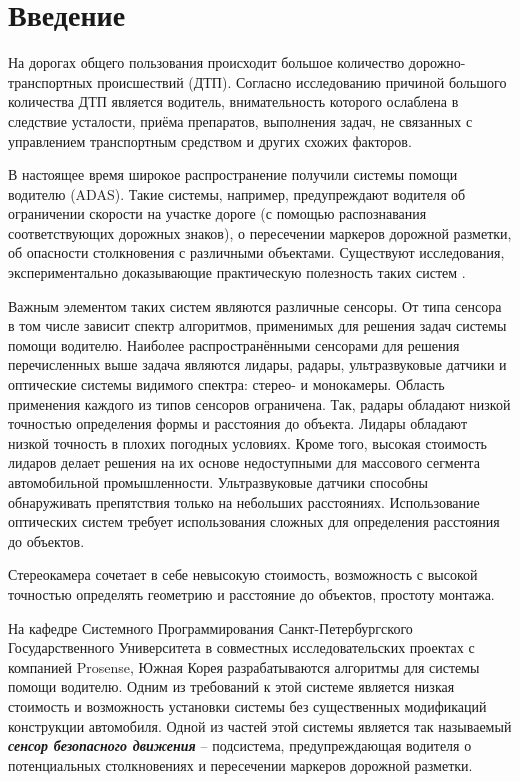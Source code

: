 \documentclass[aps,%
14pt,%
final,%
oneside,
onecolumn,%
musixtex, %
superscriptaddress,%
centertags]{extarticle} %
\begin{document}
\tableofcontents

\setcounter{page}{3}

\newpage

\section*{Введение}

На дорогах общего пользования происходит большое количество дорожно-транспортных происшествий (ДТП). Согласно исследованию \cite{staubach2009factors} причиной большого количества ДТП является водитель, внимательность которого ослаблена в следствие усталости, приёма препаратов, выполнения задач, не связанных с управлением транспортным средством и других схожих факторов.

В настоящее время широкое распространение получили системы помощи водителю (ADAS). Такие системы, например, предупреждают водителя об ограничении скорости на участке дороге (с помощью распознавания соответствующих дорожных знаков), о пересечении маркеров дорожной разметки, об опасности столкновения с различными объектами. Существуют исследования, экспериментально доказывающие практическую полезность таких систем \cite{maag2012studying}.

Важным элементом таких систем являются различные сенсоры. От типа сенсора в том числе зависит спектр алгоритмов, применимых для решения задач системы помощи водителю. Наиболее распространёнными сенсорами для решения перечисленных выше задача являются лидары, радары, ультразвуковые датчики и оптические системы видимого спектра: стерео- и монокамеры. Область применения каждого из типов сенсоров ограничена. Так, радары обладают низкой точностью определения формы и расстояния до объекта. Лидары обладают низкой точность в плохих погодных условиях. Кроме того, высокая стоимость лидаров делает решения на их основе недоступными для массового сегмента автомобильной промышленности. Ультразвуковые датчики способны обнаруживать препятствия только на небольших расстояниях. Использование оптических систем требует использования сложных для определения расстояния до объектов. 

Стереокамера сочетает в себе невысокую стоимость, возможность с высокой точностью определять геометрию и расстояние до объектов, простоту монтажа.

На кафедре Системного Программирования Санкт-Петербургского Государственного Университета в совместных исследовательских проектах с компанией Prosense, Южная Корея разрабатываются алгоритмы для системы помощи водителю. Одним из требований к этой системе является низкая стоимость и возможность установки системы без существенных модификаций конструкции автомобиля. Одной из частей этой системы является так называемый \textit{\textbf{сенсор безопасного движения}} -- подсистема, предупреждающая водителя о потенциальных столкновениях и пересечении маркеров дорожной разметки.
\end{document}
